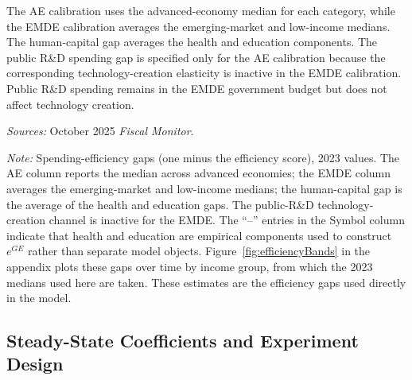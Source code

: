 \documentclass[a4paper,11pt]{article}
\newcommand{\tabnote}[2]{\vspace{2mm}\par\noindent\begin{minipage}{0.9\textwidth}\footnotesize\setlength{\parindent}{0pt}\emph{Sources: }#1\par\vspace{2mm}\emph{Note: }#2\end{minipage}}
\begin{document}
The AE calibration uses the advanced-economy median for each category, while the EMDE calibration averages the emerging-market and low-income medians.
The human-capital gap averages the health and education components.
The public R\&D spending gap is specified only for the AE calibration because the corresponding technology-creation elasticity is inactive in the EMDE calibration.
Public R\&D spending remains in the EMDE government budget but does not affect technology creation.

\begin{table}[H]
    \centering
    \caption{Derivation of the Spending-Efficiency Gaps \label{tab:efficiencyGaps}}
    \footnotesize
    \renewcommand{\arraystretch}{1.2}
    

    \vspace{1mm}
    \tabnote{October 2025 \emph{Fiscal Monitor}.}{Spending-efficiency gaps (one minus the efficiency score), 2023 values.
The AE column reports the median across advanced economies; the EMDE column averages the emerging-market and low-income medians; the human-capital gap is the average of the health and education gaps.
The public-R\&D technology-creation channel is inactive for the EMDE.
The ``--'' entries in the Symbol column indicate that health and education are empirical components used to construct $e^{GE}$ rather than separate model objects.
Figure~\ref{fig:efficiencyBands} in the appendix plots these gaps over time by income group, from which the 2023 medians used here are taken.
These estimates are the efficiency gaps used directly in the model.}
\end{table}

\subsection{Steady-State Coefficients and Experiment Design}
\end{document}
